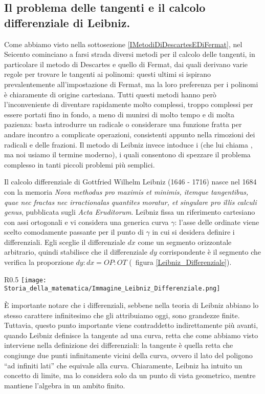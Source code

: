 \subsection{Il problema delle tangenti e il calcolo differenziale di Leibniz.}\label{IlCalcoloDifferenzialeDiLeibniz}
\par Come abbiamo visto nella sottosezione \ref{IMetodiDiDescartesEDiFermat}, nel Seicento cominciano a farsi strada diversi metodi per il calcolo delle tangenti, in particolare il metodo di Descartes e quello di Fermat, dai quali derivano varie regole per trovare le tangenti ai polinomi: questi ultimi si ispirano prevalentemente all'impostazione di Fermat, ma la loro preferenza per i polinomi \`e chiaramente di origine cartesiana. Tutti questi metodi hanno per\`o l'inconveniente di diventare rapidamente molto complessi, troppo complessi per essere portati fino in fondo, a meno di munirsi di molto tempo e di molta pazienza: basta introdurre un radicale o considerare una funzione fratta per andare incontro a complicate operazioni, consistenti appunto nella rimozioni dei radicali e delle frazioni. Il metodo di Leibniz invece intoduce i  (che lui chiama , ma noi usiamo il termine moderno), i quali consentono di spezzare il problema complesso in tanti piccoli problemi pi\`u semplici.
\par Il calcolo differenziale di Gottfried Wilhelm Leibniz (1646 - 1716) nasce nel 1684 con la memoria \textit{Nova methodus pro maximis et minimis, itemque tangentibus, quae nec fractas nec irractionalas quantites moratur, et singulare pro illis calculi genus}, pubblicata sugli \textit{Acta Eruditorum}. Leibniz fissa un riferimento cartesiano con assi ortogonali e vi considera una generica curva $\gamma$: l'asse delle ordinate viene scelto comodamente passante per il punto di $\gamma$ in cui si desidera definire i differenziali. Egli sceglie il differenziale $dx$ come un segmento orizzontale arbitrario, quindi stabilisce che il differenziale $dy$ corrispondente \`e il segmento che verifica la proporzione $dy : dx = OP : OT$ (\Cfr\ figura \ref{Leibniz_Differenziale}).
\begin{wrapfigure}{R}{0.5\textwidth}
	\texttt{[image: Storia\_della\_matematica/Immagine\_Leibniz\_Differenziale.png]}
	\caption{Definizione del differenziale di Leibniz.}
	\label{Leibniz_Differenziale}
\end{wrapfigure}
\par \`E importante notare che i differenziali, sebbene nella teoria di Leibniz abbiano lo stesso carattere infinitesimo che gli attribuiamo oggi, sono grandezze finite. Tuttavia, questo punto importante viene contraddetto indirettamente pi\`u avanti, quando Leibniz definisce la tangente ad una curva, retta che come abbiamo visto interviene nella definizione dei differenziali: la tangente \`e quella retta che congiunge due punti infinitamente vicini della curva, ovvero il lato del poligono ``ad infiniti lati'' che equivale alla curva. Chiaramente, Leibniz ha intuito un concetto di limite, ma lo considera solo da un punto di vista geometrico, mentre mantiene l'algebra in un ambito finito.
